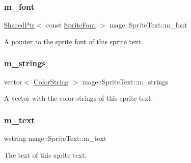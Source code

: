 \subsubsection{\texorpdfstring{m\+\_\+font}{m\_font}}
{\footnotesize\ttfamily \hyperlink{namespacemage_a1e01ae66713838a7a67d30e44c67703e}{Shared\+Ptr}$<$ const \hyperlink{classmage_1_1_sprite_font}{Sprite\+Font} $>$ mage\+::\+Sprite\+Text\+::m\+\_\+font\hspace{0.3cm}{\ttfamily [private]}}

A pointer to the sprite font of this sprite text. \hypertarget{classmage_1_1_sprite_text_ab528f96257fd7e690be765241b2d76f7}{}\label{classmage_1_1_sprite_text_ab528f96257fd7e690be765241b2d76f7} 
\subsubsection{\texorpdfstring{m\+\_\+strings}{m\_strings}}
{\footnotesize\ttfamily vector$<$ \hyperlink{classmage_1_1_color_string}{Color\+String} $>$ mage\+::\+Sprite\+Text\+::m\+\_\+strings\hspace{0.3cm}{\ttfamily [private]}}

A vector with the color strings of this sprite text. \hypertarget{classmage_1_1_sprite_text_a807d5dc467ef16f6c83762dfe6ad3391}{}\label{classmage_1_1_sprite_text_a807d5dc467ef16f6c83762dfe6ad3391} 
\subsubsection{\texorpdfstring{m\+\_\+text}{m\_text}}
{\footnotesize\ttfamily wstring mage\+::\+Sprite\+Text\+::m\+\_\+text\hspace{0.3cm}{\ttfamily [private]}}

The text of this sprite text. 